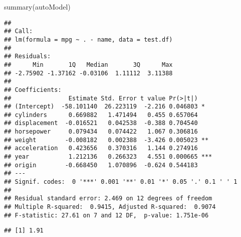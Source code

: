 \documentclass[
]{article}
\newenvironment{Shaded}{\begin{snugshade}}{\end{snugshade}}
\newcommand{\AttributeTok}[1]{\textcolor[rgb]{0.77,0.63,0.00}{#1}}
\newcommand{\CommentTok}[1]{\textcolor[rgb]{0.56,0.35,0.01}{\textit{#1}}}
\newcommand{\DecValTok}[1]{\textcolor[rgb]{0.00,0.00,0.81}{#1}}
\newcommand{\FunctionTok}[1]{\textcolor[rgb]{0.00,0.00,0.00}{#1}}
\newcommand{\NormalTok}[1]{#1}
\newcommand{\OtherTok}[1]{\textcolor[rgb]{0.56,0.35,0.01}{#1}}
\newcommand{\SpecialCharTok}[1]{\textcolor[rgb]{0.00,0.00,0.00}{#1}}
\begin{document}
\begin{Shaded}
\begin{Highlighting}[]
\FunctionTok{summary}\NormalTok{(autoModel)}
\end{Highlighting}
\end{Shaded}

\begin{verbatim}
## 
## Call:
## lm(formula = mpg ~ . - name, data = test.df)
## 
## Residuals:
##      Min       1Q   Median       3Q      Max 
## -2.75902 -1.37162 -0.03106  1.11112  3.11388 
## 
## Coefficients:
##                Estimate Std. Error t value Pr(>|t|)    
## (Intercept)  -58.101140  26.223119  -2.216 0.046803 *  
## cylinders      0.669882   1.471494   0.455 0.657064    
## displacement  -0.016521   0.042538  -0.388 0.704540    
## horsepower     0.079434   0.074422   1.067 0.306816    
## weight        -0.008182   0.002388  -3.426 0.005023 ** 
## acceleration   0.423656   0.370316   1.144 0.274916    
## year           1.212136   0.266323   4.551 0.000665 ***
## origin        -0.668450   1.070896  -0.624 0.544183    
## ---
## Signif. codes:  0 '***' 0.001 '**' 0.01 '*' 0.05 '.' 0.1 ' ' 1
## 
## Residual standard error: 2.469 on 12 degrees of freedom
## Multiple R-squared:  0.9415, Adjusted R-squared:  0.9074 
## F-statistic: 27.61 on 7 and 12 DF,  p-value: 1.751e-06
\end{verbatim}

\begin{Shaded}
\end{Shaded}

\begin{verbatim}
## [1] 1.91
\end{verbatim}
\end{document}
